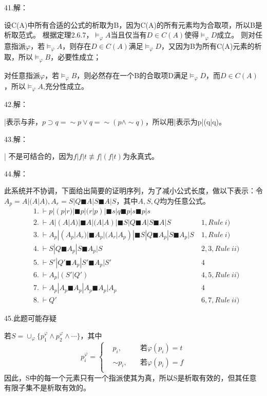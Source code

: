 \documentclass[a4paper]{ctexart}
\begin{document}
\noindent 41.解：

设C(A)中所有合适的公式的析取为B，因为C(A)的所有元素均为合取项，所以B是析取范式。
根据定理2.6.7，$\models_{\varphi}A$当且仅当有$D\in C(A)$使得$\models_\varphi D$成立。
则对任意指派$\varphi$，若$\models_{\varphi}A$，则存在$D\in C(A)$满足$\models_\varphi D$，又因为B为所有C(A)元素的析取，所以$\models_\varphi B$，必要性成立；

对任意指派$\varphi$，若$\models_{\varphi}B$，则必然存在一个B的合取项D满足$\models_\varphi D$，而$D\in C(A)$，所以$\models_{\varphi}A$,充分性成立。\newline

\noindent 42.解：

|表示与非，$p\supset q=\sim p\vee q=\sim(p\wedge\sim q)$，所以用|表示为p|(q|q)。\newline

\noindent 43.解：

| 不是可结合的，因为$f|f|t\not\equiv f|(f|t)$为永真式。\newline

\noindent 44.解：

此系统并不协调，下面给出简要的证明序列，为了减小公式长度，做以下表示：令$A_p=A|(A|A),A_r=S|Q \blacksquare A|S \blacksquare A|S$，其中$A,S,Q$均为任意公式。
\begin{align*}
  &1. \ \vdash p|(p|r)|\blacksquare p|(r|p)| \blacksquare s|q \blacksquare p|s \blacksquare p|s \\
  &2. \ \vdash A|(A|A)|\blacksquare A|(A|A)| \blacksquare S|Q \blacksquare A|S \blacksquare A|S \ &1,Rule\ i)\\
  &3. \ \vdash A_p|(A_p|A_r)|\blacksquare A_p|(A_r|A_p)| \blacksquare S|Q \blacksquare A_p|S \blacksquare A_p|S \ &1,Rule\ i)\\
  &4. \ \vdash S|Q \blacksquare A_p|S \blacksquare A_p|S \ &2,3,Rule\ ii)\\
  &5. \ \vdash S'|Q' \blacksquare A_p|S' \blacksquare A_p|S' \ &4\\
  &6. \ \vdash A_p|(S'|Q') \ &4,5,Rule\ ii)\\
  &7. \ \vdash A_p|A_p \blacksquare A_p|A_p \blacksquare A_p|A_p \ &4 \\
  &8. \ \vdash Q' \ &6,7,Rule\ ii)
\end{align*}

\noindent 45.此题可能存疑

若$S=\cup_\varphi\{p_1^\varphi\wedge p_2^\varphi\wedge\cdots\}$，其中$$p_i^\varphi=
\left\{
  \begin{aligned}
    &p_i,\quad &\text{若}\varphi(p_i)=t\\
    &\sim p_i, \quad &\text{若}\varphi(p_i)=f\\
  \end{aligned}
\right.
$$
因此，S中的每一个元素只有一个指派使其为真，所以S是析取有效的，但其任意有限子集不是析取有效的。\newline
\end{document}
